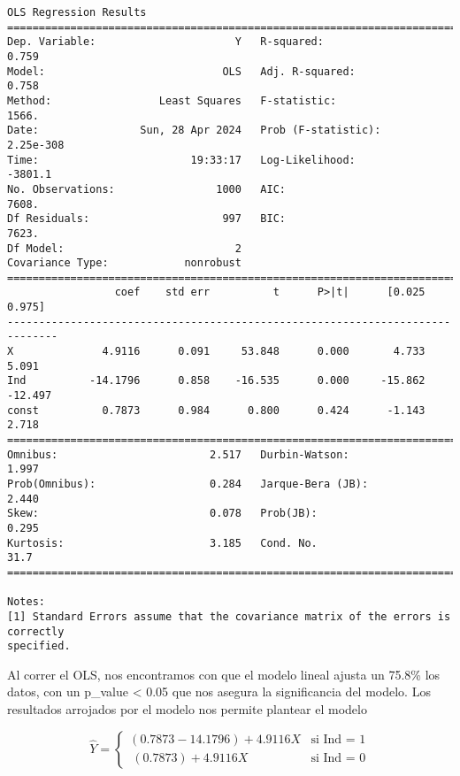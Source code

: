 \documentclass[11pt]{article}
\begin{document}
    \begin{Verbatim}[commandchars=\\\{\}]
                            OLS Regression Results
==============================================================================
Dep. Variable:                      Y   R-squared:                       0.759
Model:                            OLS   Adj. R-squared:                  0.758
Method:                 Least Squares   F-statistic:                     1566.
Date:                Sun, 28 Apr 2024   Prob (F-statistic):          2.25e-308
Time:                        19:33:17   Log-Likelihood:                -3801.1
No. Observations:                1000   AIC:                             7608.
Df Residuals:                     997   BIC:                             7623.
Df Model:                           2
Covariance Type:            nonrobust
==============================================================================
                 coef    std err          t      P>|t|      [0.025      0.975]
------------------------------------------------------------------------------
X              4.9116      0.091     53.848      0.000       4.733       5.091
Ind          -14.1796      0.858    -16.535      0.000     -15.862     -12.497
const          0.7873      0.984      0.800      0.424      -1.143       2.718
==============================================================================
Omnibus:                        2.517   Durbin-Watson:                   1.997
Prob(Omnibus):                  0.284   Jarque-Bera (JB):                2.440
Skew:                           0.078   Prob(JB):                        0.295
Kurtosis:                       3.185   Cond. No.                         31.7
==============================================================================

Notes:
[1] Standard Errors assume that the covariance matrix of the errors is correctly
specified.
    \end{Verbatim}

    Al correr el OLS, nos encontramos con que el modelo lineal ajusta un
75.8\% los datos, con un p\_value \textless{} 0.05 que nos asegura la
significancia del modelo. Los resultados arrojados por el modelo nos
permite plantear el modelo

\[ \hat{Y} = \left\{ 
    \begin{array}{ll} (0.7873-14.1796) + 4.9116X & \text{si  Ind = 1} \\
    \ (0.7873) + 4.9116X & \text {si  Ind = 0} \end{array} \right. \]
\end{document}
